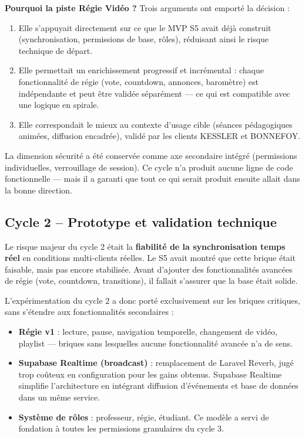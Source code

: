 \documentclass[11pt,a4paper]{report}
\begin{document}
\textbf{Pourquoi la piste Régie Vidéo ?} Trois arguments ont emporté la décision :
\begin{enumerate}
    \item Elle s'appuyait directement sur ce que le MVP S5 avait déjà construit (synchronisation, permissions de base, rôles), réduisant ainsi le risque technique de départ.
    \item Elle permettait un enrichissement progressif et incrémental : chaque fonctionnalité de régie (vote, countdown, annonces, baromètre) est indépendante et peut être validée séparément --- ce qui est compatible avec une logique en spirale.
    \item Elle correspondait le mieux au contexte d'usage cible (séances pédagogiques animées, diffusion encadrée), validé par les clients KESSLER et BONNEFOY.
\end{enumerate}

La dimension sécurité a été conservée comme axe secondaire intégré (permissions individuelles, verrouillage de session). Ce cycle n'a produit aucune ligne de code fonctionnelle --- mais il a garanti que tout ce qui serait produit ensuite allait dans la bonne direction.

\subsection{Cycle 2 -- Prototype et validation technique}

Le risque majeur du cycle 2 était la \textbf{fiabilité de la synchronisation temps réel} en conditions multi-clients réelles. Le S5 avait montré que cette brique était faisable, mais pas encore stabilisée. Avant d'ajouter des fonctionnalités avancées de régie (vote, countdown, transitions), il fallait s'assurer que la base était solide.

L'expérimentation du cycle 2 a donc porté exclusivement sur les briques critiques, sans s'étendre aux fonctionnalités secondaires :

\begin{itemize}
    \item \textbf{Régie v1} : lecture, pause, navigation temporelle, changement de vidéo, playlist --- briques sans lesquelles aucune fonctionnalité avancée n'a de sens.
    \item \textbf{Supabase Realtime (broadcast)} : remplacement de Laravel Reverb, jugé trop coûteux en configuration pour les gains obtenus. Supabase Realtime simplifie l'architecture en intégrant diffusion d'événements et base de données dans un même service.
    \item \textbf{Système de rôles} : professeur, régie, étudiant. Ce modèle a servi de fondation à toutes les permissions granulaires du cycle 3.
\end{itemize}
\end{document}
